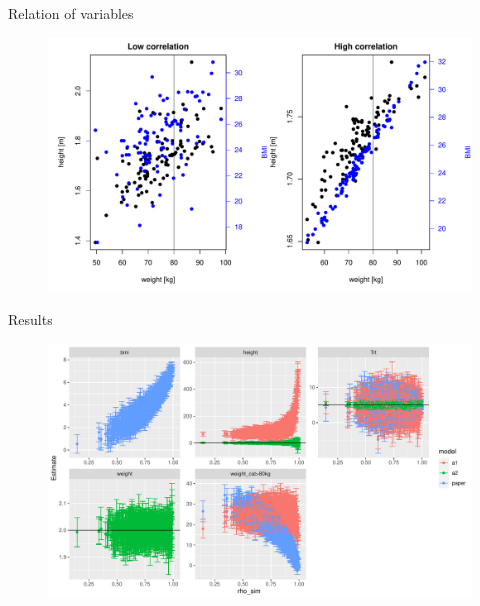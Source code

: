 \documentclass[english]{beamer}\usepackage[]{graphicx}\usepackage[]{xcolor}
\makeatletter
\def\maxwidth{ %
  \ifdim\Gin@nat@width>\linewidth
    \linewidth
  \else
    \Gin@nat@width
  \fi
}
\newenvironment{knitrout}{}{} %
\makeatother
\begin{document}
\begin{frame}{Relation of variables}

\begin{figure}[h]%
\begin{center}
\begin{knitrout}
\color{fgcolor}
\includegraphics[width=\maxwidth]{figures/figcollinearitydata-1} 
\end{knitrout}
\end{center}
\end{figure}


\end{frame}
\begin{frame}[plain]{Results}

\begin{figure}[h]%
\begin{center}
\begin{knitrout}
\color{fgcolor}
\includegraphics[width=\maxwidth]{figures/figresults-1} 
\end{knitrout}
\end{center}
\end{figure}


\end{frame}
\end{document}
